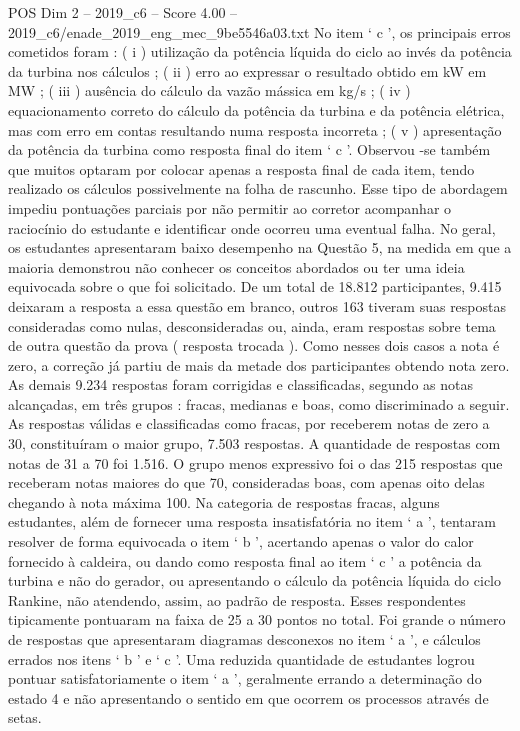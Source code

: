 \begin{textsample}{POS Dim 2 – 2019\_c6 – Score 4.00 – 2019\_c6/enade\_2019\_eng\_mec\_9be5546a03.txt}
No item ‘ c ’, os principais erros cometidos foram : ( i ) utilização da potência líquida do ciclo ao invés da potência da turbina nos cálculos ; ( ii ) erro ao expressar o resultado obtido em kW em MW ; ( iii ) ausência do cálculo da vazão mássica em kg/s ; ( iv ) equacionamento correto do cálculo da potência da turbina e da potência elétrica, mas com erro em contas resultando numa resposta incorreta ; ( v ) apresentação da potência da turbina como resposta final do item ‘ c ’.
Observou -se também que muitos optaram por colocar apenas a resposta final de cada item, tendo realizado os cálculos possivelmente na folha de rascunho.
Esse tipo de abordagem impediu pontuações parciais por não permitir ao corretor acompanhar o raciocínio do estudante e identificar onde ocorreu uma eventual falha.
No geral, os estudantes apresentaram baixo desempenho na Questão 5, na medida em que a maioria demonstrou não conhecer os conceitos abordados ou ter uma ideia equivocada sobre o que foi solicitado.
De um total de 18.812 participantes, 9.415 deixaram a resposta a essa questão em branco, outros 163 tiveram suas respostas consideradas como nulas, desconsideradas ou, ainda, eram respostas sobre tema de outra questão da prova ( resposta trocada ).
Como nesses dois casos a nota é zero, a correção já partiu de mais da metade dos participantes obtendo nota zero.
As demais 9.234 respostas foram corrigidas e classificadas, segundo as notas alcançadas, em três grupos : fracas, medianas e boas, como discriminado a seguir.
As respostas válidas e classificadas como fracas, por receberem notas de zero a 30, constituíram o maior grupo, 7.503 respostas.
A quantidade de respostas com notas de 31 a 70 foi 1.516.
O grupo menos expressivo foi o das 215 respostas que receberam notas maiores do que 70, consideradas boas, com apenas oito delas chegando à nota máxima 100.
Na categoria de respostas fracas, alguns estudantes, além de fornecer uma resposta insatisfatória no item ‘ a ’, tentaram resolver de forma equivocada o item ‘ b ’, acertando apenas o valor do calor fornecido à caldeira, ou dando como resposta final ao item ‘ c ’ a potência da turbina e não do gerador, ou apresentando o cálculo da potência líquida do ciclo Rankine, não atendendo, assim, ao padrão de resposta.
Esses respondentes tipicamente pontuaram na faixa de 25 a 30 pontos no total.
Foi grande o número de respostas que apresentaram diagramas desconexos no item ‘ a ’, e cálculos errados nos itens ‘ b ’ e ‘ c ’.
Uma reduzida quantidade de estudantes logrou pontuar satisfatoriamente o item ‘ a ’, geralmente errando a determinação do estado 4 e não apresentando o sentido em que ocorrem os processos através de setas.

\end{textsample}

